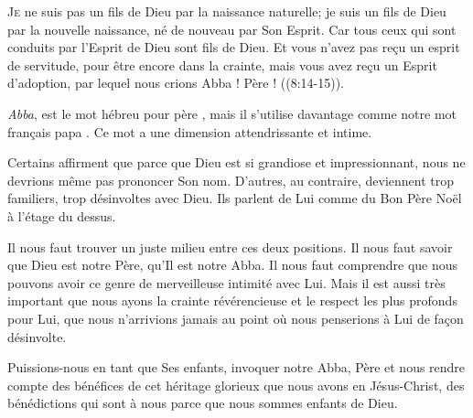\dvrule








\lettrine{J}{e} ne suis pas un fils de Dieu par la naissance naturelle;
 je suis un fils de Dieu par la nouvelle naissance, né de nouveau
 par Son Esprit.
 \Og Car tous ceux qui sont conduits par l'Esprit de Dieu sont fils de Dieu.
 Et vous n'avez pas re\c{c}u un esprit de servitude, pour être encore
 dans la crainte, mais vous avez re\c{c}u un Esprit d'adoption, par lequel
 nous crions\frcolon{} \Og Abba ! Père ! \Fg{} ((8:14-15)).

\emph{Abba}, est le mot hébreu pour \Og père \Fg{},
 mais il s'utilise davantage comme notre mot fran\c{c}ais \Og papa \Fg{}.
 Ce mot a une dimension attendrissante et intime.


Certains affirment que parce que Dieu est si grandiose et impressionnant,
 nous ne devrions même pas prononcer Son nom. D'autres, au contraire,
 deviennent trop familiers, trop désinvoltes avec Dieu.
 Ils parlent de Lui comme du \Og Bon Père Noël à l'étage du dessus. \Fg{}

Il nous faut trouver un juste milieu entre ces deux positions.
 Il nous faut savoir que Dieu est notre Père, qu'Il est notre Abba.
 Il nous faut comprendre que nous pouvons avoir ce genre de merveilleuse
 intimité avec Lui. Mais il est aussi très important que nous ayons
 la crainte révérencieuse et le respect les plus profonds pour Lui,
 que nous n'arrivions jamais au point où nous penserions à Lui
 de fa\c{c}on désinvolte.

Puissions-nous en tant que Ses enfants, invoquer notre Abba,
 Père et nous rendre compte des bénéfices de cet héritage glorieux
 que nous avons en Jésus-Christ, des bénédictions qui sont à nous
 parce que nous sommes enfants de Dieu. 

